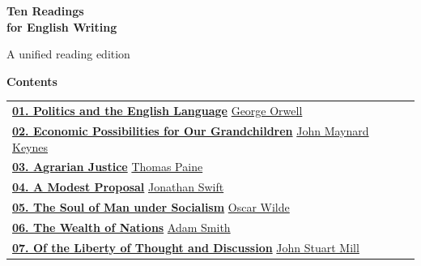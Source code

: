 \setarticlelabel{}
\thispagestyle{fancy}
\begingroup\raggedright
\setlength{\parindent}{0pt}
{\fontsize{24}{30}\selectfont\bfseries Ten Readings\\ for English Writing\par}
\vspace{9pt}
{\fontsize{12}{18}\selectfont A unified reading edition\par}
\vspace{14pt}
{\fontsize{14}{19.5}\selectfont\bfseries Contents\par}
\vspace{10pt}
\endgroup
\begingroup
\setlength{\parindent}{0pt}
\renewcommand{\arraystretch}{1.45}
\setlength{\tabcolsep}{0pt}
\noindent\begin{tabularx}{\textwidth}{@{}X r@{}}
\hyperref[article-01]{\textbf{01. Politics and the English Language}}\newline
{\small\color{headgrey}\hyperref[article-01]{George Orwell}}
& \hyperref[article-01]{\pageref{article-01}}\\[6pt]
\hyperref[article-02]{\textbf{02. Economic Possibilities for Our Grandchildren}}\newline
{\small\color{headgrey}\hyperref[article-02]{John Maynard Keynes}}
& \hyperref[article-02]{\pageref{article-02}}\\[6pt]
\hyperref[article-03]{\textbf{03. Agrarian Justice}}\newline
{\small\color{headgrey}\hyperref[article-03]{Thomas Paine}}
& \hyperref[article-03]{\pageref{article-03}}\\[6pt]
\hyperref[article-04]{\textbf{04. A Modest Proposal}}\newline
{\small\color{headgrey}\hyperref[article-04]{Jonathan Swift}}
& \hyperref[article-04]{\pageref{article-04}}\\[6pt]
\hyperref[article-05]{\textbf{05. The Soul of Man under Socialism}}\newline
{\small\color{headgrey}\hyperref[article-05]{Oscar Wilde}}
& \hyperref[article-05]{\pageref{article-05}}\\[6pt]
\hyperref[article-06]{\textbf{06. The Wealth of Nations}}\newline
{\small\color{headgrey}\hyperref[article-06]{Adam Smith}}
& \hyperref[article-06]{\pageref{article-06}}\\[6pt]
\hyperref[article-07]{\textbf{07. Of the Liberty of Thought and Discussion}}\newline
{\small\color{headgrey}\hyperref[article-07]{John Stuart Mill}}

\end{tabularx}
